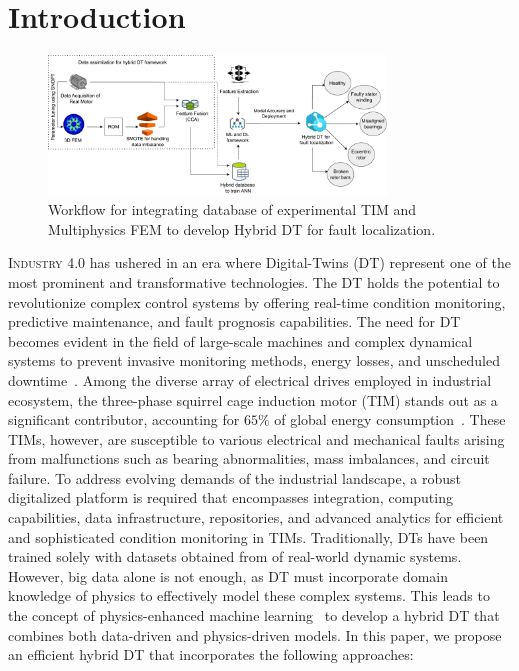 \documentclass[a4paper,conference]{IEEEtran}
\begin{document}
\section{Introduction}
\begin{figure}[t!]
    \centering
    \includegraphics[width=0.8\textwidth]{Figs/hh.drawio.pdf}
    \caption{Workflow for integrating database of experimental TIM and Multiphysics FEM to develop Hybrid DT for fault localization.}
    \label{fig:DAQ}
\end{figure}
\lettrine{I}{ndustry} 4.0 has ushered in an era where Digital-Twins (DT) represent one of the most prominent and transformative technologies. The DT holds the potential to revolutionize complex control systems by offering real-time condition monitoring, predictive maintenance, and fault prognosis capabilities. The need for DT becomes evident in the field of large-scale machines and complex dynamical systems to prevent invasive monitoring methods, energy losses, and unscheduled downtime~\cite{8930293}. Among the diverse array of electrical drives employed in industrial ecosystem, the three-phase squirrel cage induction motor (TIM) stands out as a significant contributor, accounting for $65\%$ of global energy consumption~\cite{GHOSH20201139}. These TIMs, however, are susceptible to various electrical and mechanical faults arising from malfunctions such as bearing abnormalities, mass imbalances, and circuit failure. To address evolving demands of the industrial landscape, a robust digitalized platform is required that encompasses integration, computing capabilities, data infrastructure, repositories, and advanced analytics for efficient and sophisticated condition monitoring in TIMs. Traditionally, DTs have been trained solely with datasets obtained from of real-world dynamic systems. However, big data alone is not enough, as DT must incorporate domain knowledge of physics to effectively model these complex systems. This leads to the concept of physics-enhanced machine learning~\cite{pawar2021hybrid} to develop a hybrid DT that combines both data-driven and physics-driven models. In this paper, we propose an efficient hybrid DT that incorporates the following approaches:
\end{document}
